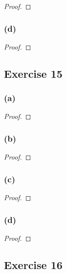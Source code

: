 \documentclass[14pt]{extarticle}
\begin{document}
\begin{proof}

\end{proof}

\subsubsection{(d)}

\begin{proof}

\end{proof}

\subsection{Exercise 15}

\subsubsection{(a)}

\begin{proof}

\end{proof}

\subsubsection{(b)}

\begin{proof}

\end{proof}

\subsubsection{(c)}

\begin{proof}

\end{proof}

\subsubsection{(d)}

\begin{proof}

\end{proof}

\subsection{Exercise 16}
\end{document}
